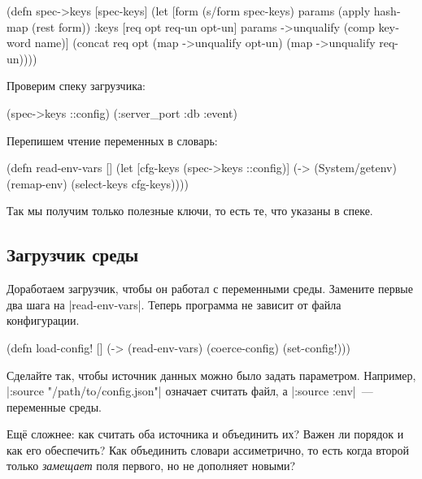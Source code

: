 \begin{english}
  \begin{clojure}
(defn spec->keys
  [spec-keys]
  (let [form (s/form spec-keys)
        params (apply hash-map (rest form))
        {:keys [req opt req-un opt-un]} params
        ->unqualify (comp keyword name)]
    (concat req
            opt
            (map ->unqualify opt-un)
            (map ->unqualify req-un))))
  \end{clojure}
\end{english}

\noindent
Проверим спеку загрузчика:

\begin{english}
  \begin{clojure}
(spec->keys ::config)
(:server_port :db :event)
  \end{clojure}
\end{english}

\noindent
Перепишем чтение переменных в словарь:

\begin{english}
  \begin{clojure}
(defn read-env-vars []
  (let [cfg-keys (spec->keys ::config)]
    (-> (System/getenv)
        (remap-env)
        (select-keys cfg-keys))))
  \end{clojure}
\end{english}

\noindent
Так мы получим только полезные ключи, то есть те, что указаны в спеке.

\subsection{Загрузчик среды}

Доработаем загрузчик, чтобы он работал с переменными среды. Замените первые два
шага на \spverb|read-env-vars|. Теперь программа не зависит от файла
конфигурации.

\begin{english}
  \begin{clojure}
(defn load-config! []
  (-> (read-env-vars)
      (coerce-config)
      (set-config!)))
  \end{clojure}
\end{english}

Сделайте так, чтобы источник данных можно было задать параметром. Например,
\spverb|:source "/path/to/config.json"| означает считать файл, а
\spverb|:source :env|~--- переменные среды.

Ещ\"{е} сложнее: как считать оба источника и объединить их? Важен ли порядок и
как его обеспечить? Как объединить словари ассиметрично, то есть когда второй
только \emph{замещает} поля первого, но не дополняет новыми?

